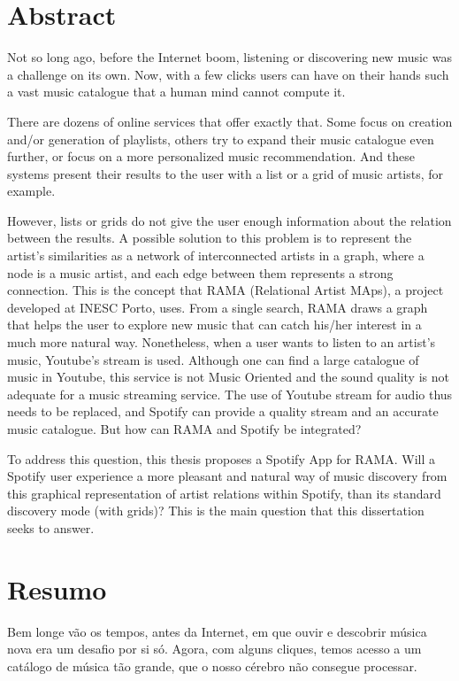 
\chapter*{Abstract}

Not so long ago, before the Internet boom, listening or discovering new music was a challenge on its own.
Now, with a few clicks users can have on their hands such a vast music catalogue that a human mind cannot compute it.

There are dozens of online services that offer  exactly that.
Some focus on creation and/or generation of playlists, others try to expand their music catalogue even further, or focus on a more personalized music recommendation.
And these systems present their results to the user with a list or a grid of music artists, for example.

However, lists or grids do not give the user enough information about the relation between the results.
A possible solution to this problem is to represent the artist's similarities as a network of interconnected artists in a graph, where a node is a music artist, and each edge between them represents a strong connection.
This is the concept that RAMA (Relational Artist MAps), a project developed at INESC Porto, uses.
From a single search, RAMA draws a graph that helps the user to explore new music that can catch his/her interest in a much more natural way.
Nonetheless, when a user wants to listen to an artist's music, Youtube's stream is used.
Although one can find a large catalogue of music in Youtube, this service is not Music Oriented and the sound quality is not adequate for a music streaming service.
The use of Youtube stream for audio thus needs to be replaced, and Spotify can provide a quality stream and an accurate music catalogue.
But how can RAMA and Spotify be integrated?

To address this question, this thesis proposes a Spotify App for RAMA.
Will a Spotify user experience a more pleasant and natural way of music discovery from this graphical representation of artist relations within Spotify, than its standard discovery mode (with grids)?
This is the main question that this dissertation seeks to answer.

\chapter*{Resumo}

Bem longe vão os tempos, antes da Internet, em que ouvir e descobrir música nova era um desafio por si só.
Agora, com alguns cliques, temos acesso a um catálogo de música tão grande, que o nosso cérebro não consegue processar.

